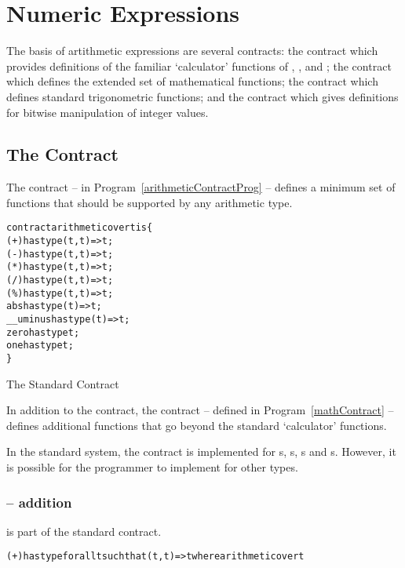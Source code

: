\chapter{Numeric Expressions}
\label{numbers}

The basis of artithmetic expressions are several contracts: the  contract which provides definitions of the familiar `calculator' functions of \q{+}, \q{-}, \q{*} and \q{/}; the  contract which defines the extended set of mathematical functions; the  contract which defines standard trigonometric functions; and the  contract which gives definitions for bitwise manipulation of integer values.

\section{The  Contract}
\label{arithmeticContract}

The  contract -- in Program~\vref{arithmeticContractProg} -- defines a minimum set of functions that should be supported by any arithmetic type.

\begin{program}
\begin{alltt}
contract arithmetic over t is \{
  (+) has type (t,t)=>t;
  (-) has type (t,t)=>t;
  (*) has type (t,t)=>t;
  (/) has type (t,t)=>t;
  (\%) has type (t,t) => t;
  abs has type (t)=>t;
  __uminus has type (t)=>t;
  zero has type t;
  one has type t;
\}
\end{alltt}
\caption{The Standard  Contract\label{arithmeticContractProg}}
\end{program}

In addition to the  contract, the  contract -- defined in Program~\vref{mathContract} -- defines additional functions that go beyond the standard `calculator' functions.

\begin{aside}
In the standard system, the  contract is implemented for s, s, s and s. However, it is possible for the programmer to implement  for other types.
\end{aside}

\subsection{\q{+} -- addition}
\label{plusFunction}
\q{+} is part of the standard  contract.
\begin{alltt}
(+) has type for all t such that (t,t)=>t where arithmetic over t
\end{alltt}

